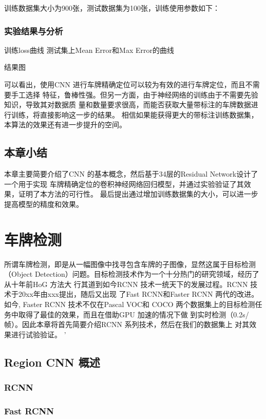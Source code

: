 训练数据集大小为900张，测试数据集为100张，训练使用参数如下：


\subsection{实验结果与分析}

训练loss曲线
测试集上Mean Error和Max Error的曲线

结果图

可以看出，使用CNN 进行车牌精确定位可以较为有效的进行车牌定位，而且不需要手工选择
特征，鲁棒性强。但另一方面，由于神经网络的训练由于不需要先验知识，导致其对数据质
量和数量要求很高，而能否获取大量带标注的车牌数据进行训练，将直接影响这一步的结果。
相信如果能获得更大的带标注训练数据集，本算法的效果还有进一步提升的空间。

\section{本章小结}

本章主要简要介绍了CNN 的基本概念，然后基于34层的Residual Network设计了一个用于实现
车牌精确定位的卷积神经网络回归模型，并通过实验验证了其效果，证明了本方法的可行性。
最后提出通过增加训练数据集的大小，可以进一步提高模型的精度和效果。

\chapter{车牌检测}

所谓车牌检测，即是从一幅图像中找寻包含车牌的子图像，显然这属于目标检测（Object
Detection）问题。目标检测技术作为一个十分热门的研究领域，经历了从十年前HoG 方法大
行其道到如今RCNN 技术一统天下的发展过程。RCNN 技术于20xx年由xxx提出，随后又出现
了Fast RCNN和Faster RCNN 两代的改进。如今, Faster RCNN 技术不仅在Pascal VOC和
COCO 两个数据集上的目标检测任务中取得了最佳的效果，而且在借助GPU 加速的情况下做
到实时检测（0.2s/帧）。因此本章将首先简要介绍RCNN 系列技术，然后在我们的数据集上
对其效果进行试验验证。
 '
\section{Region CNN 概述}

\subsection{RCNN}

\subsection{Fast RCNN}

